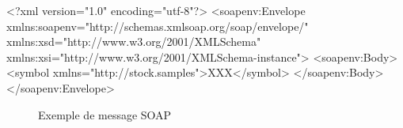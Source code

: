 \begin{verbbox}
    <?xml version="1.0" encoding="utf-8"?>
    <soapenv:Envelope
    xmlns:soapenv="http://schemas.xmlsoap.org/soap/envelope/"
    xmlns:xsd="http://www.w3.org/2001/XMLSchema"
    xmlns:xsi="http://www.w3.org/2001/XMLSchema-instance">
    <soapenv:Body>
    <symbol xmlns="http://stock.samples">XXX</symbol>
    </soapenv:Body>
    </soapenv:Envelope>
\end{verbbox}

\begin{figure}[h]
    \centering
    \setlength{\fboxrule}{0.00001pt}
    \setlength{\fboxsep}{5pt}

    \fbox{
	\theverbbox
    }
    \caption{Exemple de message SOAP}
    \label{fig:soap-message-example}
\end{figure}

